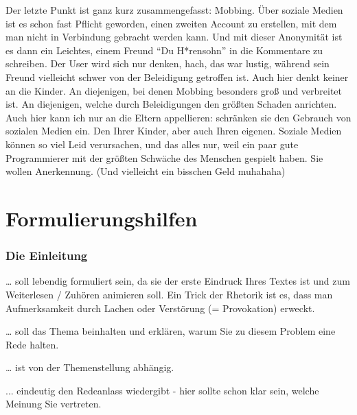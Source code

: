  

Der letzte Punkt ist ganz kurz zusammengefasst: Mobbing. Über soziale Medien ist es schon fast Pflicht geworden, einen zweiten Account zu erstellen, mit dem man nicht in Verbindung gebracht werden kann. Und mit dieser Anonymität ist es dann ein Leichtes, einem Freund “Du H*rensohn” in die Kommentare zu schreiben. Der User wird sich nur denken, hach, das war lustig, während sein Freund vielleicht schwer von der Beleidigung getroffen ist. Auch hier denkt keiner an die Kinder. An diejenigen, bei denen Mobbing besonders groß und verbreitet ist. An diejenigen, welche durch Beleidigungen den größten Schaden anrichten. Auch hier kann ich nur an die Eltern appellieren: schränken sie den Gebrauch von sozialen Medien ein. Den Ihrer Kinder, aber auch Ihren eigenen. Soziale Medien können so viel Leid verursachen, und das alles nur, weil ein paar gute Programmierer mit der größten Schwäche des Menschen gespielt haben. Sie wollen Anerkennung. (Und vielleicht ein bisschen Geld muhahaha) 

\newpage

\section{Formulierungshilfen}
\subsubsection{Die Einleitung}
\begin{compactitem}
    \item … soll lebendig formuliert sein, da sie der erste Eindruck Ihres Textes ist und zum Weiterlesen / Zuhören animieren soll. Ein Trick der Rhetorik ist es, dass man Aufmerksamkeit durch Lachen oder Verstörung (= Provokation) erweckt. 
    \item  … soll das Thema beinhalten und erklären, warum Sie zu diesem Problem eine Rede halten. 
    \item    … ist von der Themenstellung abhängig. 
    \item  ... eindeutig den Redeanlass wiedergibt - hier sollte schon klar sein, welche Meinung Sie vertreten.  
\end{compactitem}
